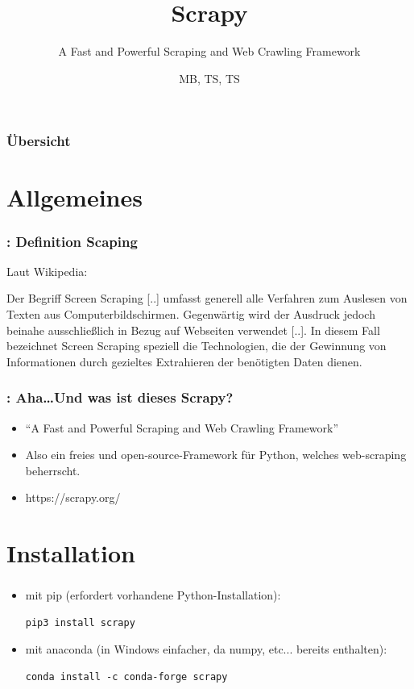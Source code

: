 \documentclass{beamer}
\title{Scrapy}
\subtitle{A Fast and Powerful Scraping and Web Crawling Framework}
\author{MB, TS, TS}
\begin{document}
\frame{\titlepage}
\begin{frame}
	\frametitle{Übersicht}
	\tableofcontents
\end{frame}
\section{Allgemeines}
\begin{frame}[fragile]
\frametitle{\insertsection{}: Definition Scaping}
		Laut Wikipedia:
		
		Der Begriff Screen Scraping [..] umfasst
		generell alle Verfahren zum Auslesen von Texten aus Computerbildschirmen. 
		Gegenwärtig wird der Ausdruck jedoch beinahe ausschließlich in Bezug auf Webseiten 
		verwendet [..]. In diesem Fall bezeichnet Screen Scraping speziell die
		Technologien, die der Gewinnung von Informationen durch gezieltes Extrahieren der benötigten Daten dienen.
\end{frame}

\begin{frame}[fragile]
\frametitle{\insertsection{}: Aha\ldots Und was ist dieses Scrapy?}
	\begin{itemize}
		\item "`A Fast and Powerful Scraping and Web Crawling Framework"'
		\item Also ein freies und open-source-Framework für Python, welches
		web-scraping beherrscht.
		\item https://scrapy.org/
	
	\end{itemize}
\end{frame}

\section{Installation}
\begin{frame}[fragile]
	\frametitle{\insertsection}
	\begin{itemize}
		\item mit pip (erfordert vorhandene Python-Installation):
			\begin{lstlisting}
pip3 install scrapy
			\end{lstlisting}
		\item mit anaconda (in Windows einfacher, da numpy, etc... bereits enthalten):
			\begin{lstlisting}
conda install -c conda-forge scrapy
			\end{lstlisting}
	\end{itemize}
\end{frame}
\end{document}
